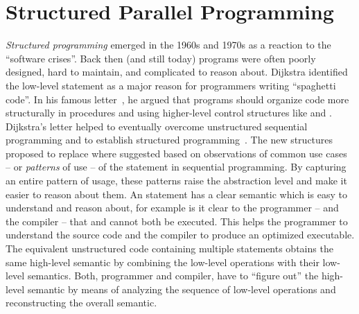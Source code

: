 \section{Structured Parallel Programming}
\emph{Structured programming} emerged in the 1960s and 1970s as a reaction to the ``software crises''.
Back then (and still today) programs were often poorly designed, hard to maintain, and complicated to reason about.
Dijkstra identified the low-level  statement as a major reason for programmers writing ``spaghetti code''.
In his famous letter~\cite{Dijkstra68a}, he argued that programs should organize code more structurally in procedures and using higher-level control structures like  and .
Dijkstra's letter helped to eventually overcome unstructured sequential programming and to establish structured programming~\cite{DahlDiHo1972}.
The new structures proposed to replace  where suggested based on observations of common use cases -- or \emph{patterns} of use -- of the  statement in sequential programming.
By capturing an entire pattern of usage, these patterns raise the abstraction level and make it easier to reason about them.
An  statement has a clear semantic which is easy to understand and reason about, for example is it clear to the programmer -- and the compiler -- that  and  cannot both be executed.
This helps the programmer to understand the source code and the compiler to produce an optimized executable.
The equivalent unstructured code containing multiple  statements obtains the same high-level semantic by combining the low-level operations with their low-level semantics.
Both, programmer and compiler, have to ``figure out'' the high-level semantic by means of analyzing the sequence of low-level operations and reconstructing the overall semantic.


